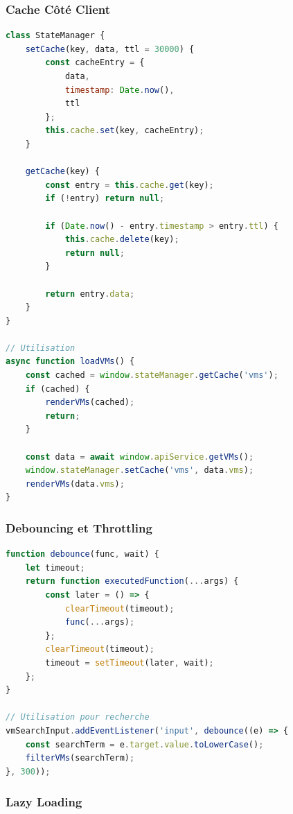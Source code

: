 \documentclass[12pt,a4paper]{article}
\begin{document}
\subsubsection{Cache Côté Client}

\begin{lstlisting}[language=JavaScript,caption=Système de cache (state-manager.js)]
class StateManager {
    setCache(key, data, ttl = 30000) {
        const cacheEntry = {
            data,
            timestamp: Date.now(),
            ttl
        };
        this.cache.set(key, cacheEntry);
    }

    getCache(key) {
        const entry = this.cache.get(key);
        if (!entry) return null;
        
        if (Date.now() - entry.timestamp > entry.ttl) {
            this.cache.delete(key);
            return null;
        }
        
        return entry.data;
    }
}

// Utilisation
async function loadVMs() {
    const cached = window.stateManager.getCache('vms');
    if (cached) {
        renderVMs(cached);
        return;
    }
    
    const data = await window.apiService.getVMs();
    window.stateManager.setCache('vms', data.vms);
    renderVMs(data.vms);
}
\end{lstlisting}

\subsubsection{Debouncing et Throttling}

\begin{lstlisting}[language=JavaScript,caption=Debounce (navigation.js)]
function debounce(func, wait) {
    let timeout;
    return function executedFunction(...args) {
        const later = () => {
            clearTimeout(timeout);
            func(...args);
        };
        clearTimeout(timeout);
        timeout = setTimeout(later, wait);
    };
}

// Utilisation pour recherche
vmSearchInput.addEventListener('input', debounce((e) => {
    const searchTerm = e.target.value.toLowerCase();
    filterVMs(searchTerm);
}, 300));
\end{lstlisting}

\subsubsection{Lazy Loading}
\end{document}
